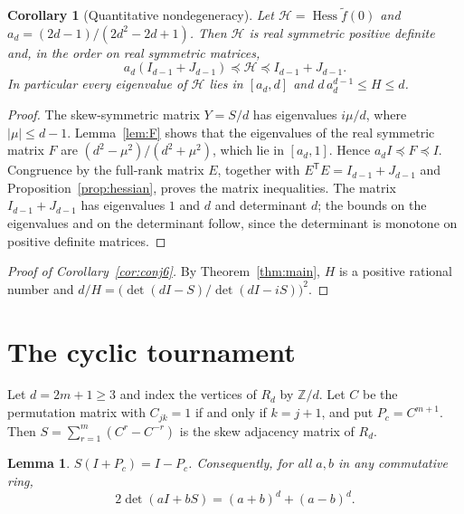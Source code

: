 \documentclass[11pt,a4paper,reqno]{amsart}
\newtheorem{lemma}[theorem]{Lemma}
\newtheorem{corollary}[theorem]{Corollary}
\theoremstyle{remark}
\numberwithin{equation}{section}
\newcommand{\T}{\mathsf{T}}
\newcommand{\Hess}{\operatorname{Hess}}
\newcommand{\Z}{\mathbb{Z}}
\begin{document}
\begin{corollary}[Quantitative nondegeneracy]\label{cor:positivehessian}
Let $\mathcal H=\Hess\tilde f(0)$ and $a_d=(2d-1)/(2d^2-2d+1)$. Then $\mathcal H$ is real symmetric positive definite and, in the order on real symmetric matrices,
\[
a_d(I_{d-1}+J_{d-1})\preceq\mathcal H\preceq I_{d-1}+J_{d-1}.
\]
In particular every eigenvalue of $\mathcal H$ lies in $[a_d,d]$ and $d\,a_d^{d-1}\le H\le d$.
\end{corollary}

\begin{proof}
The skew-symmetric matrix $Y=S/d$ has eigenvalues $i\mu/d$, where $|\mu|\le d-1$. Lemma~\ref{lem:F} shows that the eigenvalues of the real symmetric matrix $F$ are $(d^2-\mu^2)/(d^2+\mu^2)$, which lie in $[a_d,1]$. Hence $a_d I\preceq F\preceq I$. Congruence by the full-rank matrix $E$, together with $E^\T E=I_{d-1}+J_{d-1}$ and Proposition~\ref{prop:hessian}, proves the matrix inequalities. The matrix $I_{d-1}+J_{d-1}$ has eigenvalues $1$ and $d$ and determinant $d$; the bounds on the eigenvalues and on the determinant follow, since the determinant is monotone on positive definite matrices.
\end{proof}

\begin{proof}[Proof of Corollary~\ref{cor:conj6}]
By Theorem~\ref{thm:main}, $H$ is a positive rational number and $d/H=\bigl(\det(dI-S)/\det(dI-iS)\bigr)^2$.
\end{proof}

\section{The cyclic tournament}\label{sec:cyclic}

Let $d=2m+1\ge3$ and index the vertices of $R_d$ by $\Z/d$. Let $C$ be the permutation matrix with $C_{jk}=1$ if and only if $k=j+1$, and put $P_c=C^{m+1}$. Then $S=\sum_{r=1}^m(C^r-C^{-r})$ is the skew adjacency matrix of $R_d$.

\begin{lemma}\label{lem:cayley}
$S(I+P_c)=I-P_c$. Consequently, for all $a,b$ in any commutative ring,
\begin{equation}\label{eq:aIbS}
2\det(aI+bS)=(a+b)^d+(a-b)^d.
\end{equation}
\end{lemma}
\end{document}
